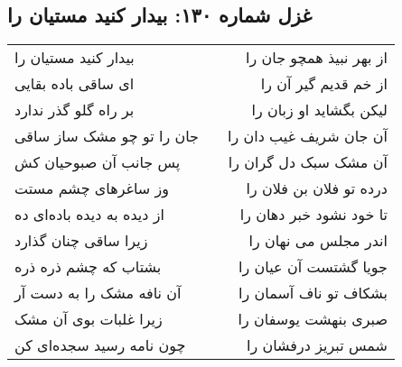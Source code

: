 \begin{center}
\section*{غزل شماره ۱۳۰: بیدار کنید مستیان را}
\label{sec:0130}
\begin{longtable}{l p{0.5cm} r}
بیدار کنید مستیان را
&&
از بهر نبیذ همچو جان را
\\
ای ساقی باده بقایی
&&
از خم قدیم گیر آن را
\\
بر راه گلو گذر ندارد
&&
لیکن بگشاید او زبان را
\\
جان را تو چو مشک ساز ساقی
&&
آن جان شریف غیب دان را
\\
پس جانب آن صبوحیان کش
&&
آن مشک سبک دل گران را
\\
وز ساغرهای چشم مستت
&&
درده تو فلان بن فلان را
\\
از دیده به دیده باده‌ای ده
&&
تا خود نشود خبر دهان را
\\
زیرا ساقی چنان گذارد
&&
اندر مجلس می نهان را
\\
بشتاب که چشم ذره ذره
&&
جویا گشتست آن عیان را
\\
آن نافه مشک را به دست آر
&&
بشکاف تو ناف آسمان را
\\
زیرا غلبات بوی آن مشک
&&
صبری بنهشت یوسفان را
\\
چون نامه رسید سجده‌ای کن
&&
شمس تبریز درفشان را
\\
\end{longtable}
\end{center}
